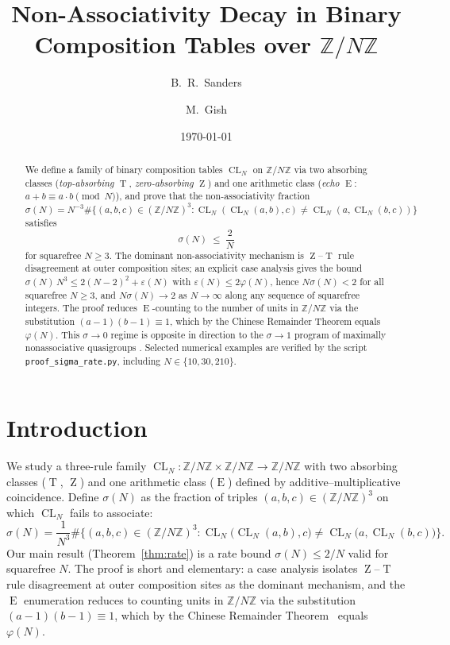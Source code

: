\documentclass[11pt,reqno]{amsart}
\title[Non-associativity decay on \texorpdfstring{$\mathbb{Z}/N\mathbb{Z}$}{Z/NZ}]%
{Non-Associativity Decay in Binary Composition Tables over
$\mathbb{Z}/N\mathbb{Z}$}
\author{B.~R.~Sanders}
\author{M.~Gish}
\date{\today}
\theoremstyle{plain}
\theoremstyle{definition}
\theoremstyle{remark}
\DeclareMathOperator{\CL}{CL}
\DeclareMathOperator{\ECHO}{E}
\DeclareMathOperator{\HARM}{T}
\DeclareMathOperator{\VOID}{Z}
\newcommand{\ZN}{\mathbb{Z}/N\mathbb{Z}}
\begin{document}
\begin{abstract}
We define a family of binary composition tables $\CL_N$ on $\ZN$ via
two absorbing classes (\emph{top-absorbing} $\HARM$, \emph{zero-absorbing}
$\VOID$) and one arithmetic class (\emph{echo} $\ECHO$: $a+b\equiv a\cdot b\pmod N$),
and prove that the non-associativity fraction
$\sigma(N)=N^{-3}\#\{(a,b,c)\in(\ZN)^{3}:\CL_N(\CL_N(a,b),c)\neq\CL_N(a,\CL_N(b,c))\}$
satisfies
\[
  \sigma(N)\;\le\;\frac{2}{N}
\]
for squarefree $N\ge 3$. The dominant non-associativity mechanism is
$\VOID$--$\HARM$ rule disagreement at outer composition sites; an
explicit case analysis gives the bound
$\sigma(N)\,N^{3}\le 2(N-2)^{2}+\varepsilon(N)$ with
$\varepsilon(N)\le 2\varphi(N)$, hence $N\sigma(N)<2$ for all
squarefree $N\ge 3$, and $N\sigma(N)\to 2$ as $N\to\infty$ along
any sequence of squarefree integers. The proof reduces $\ECHO$-counting to
the number of units in $\ZN$ via the substitution
$(a-1)(b-1)\equiv 1$, which by the Chinese Remainder Theorem equals
$\varphi(N)$. This $\sigma\to 0$ regime is opposite in direction to
the $\sigma\to 1$ program of maximally nonassociative quasigroups
\cite{DrapalWanless2021,DrapalLisonek2020}. Selected numerical examples
are verified by the script \texttt{proof\_sigma\_rate.py}, including
$N\in\{10,30,210\}$.
\end{abstract}

\maketitle

\section{Introduction}\label{sec:intro}

We study a three-rule family $\CL_N:\ZN\times\ZN\to\ZN$ with two
absorbing classes ($\HARM$, $\VOID$) and one arithmetic class
($\ECHO$) defined by additive--multiplicative coincidence. Define
$\sigma(N)$ as the fraction of triples $(a,b,c)\in(\ZN)^3$ on which
$\CL_N$ fails to associate:
\begin{equation}\label{eq:sigma-def}
  \sigma(N)=\frac{1}{N^{3}}
  \#\Big\{(a,b,c)\in(\ZN)^{3}:
         \CL_N\!\big(\CL_N(a,b),c\big)\neq\CL_N\!\big(a,\CL_N(b,c)\big)\Big\}.
\end{equation}
Our main result (Theorem~\ref{thm:rate}) is a rate bound
$\sigma(N)\le 2/N$ valid for squarefree $N$. The proof is short
and elementary: a case analysis isolates $\VOID$--$\HARM$ rule
disagreement at outer composition sites as the dominant mechanism,
and the $\ECHO$ enumeration reduces to counting units in $\ZN$
via the substitution $(a-1)(b-1)\equiv 1$, which by the Chinese
Remainder Theorem~\cite{Gauss1801,Lang2002} equals $\varphi(N)$.
\end{document}
